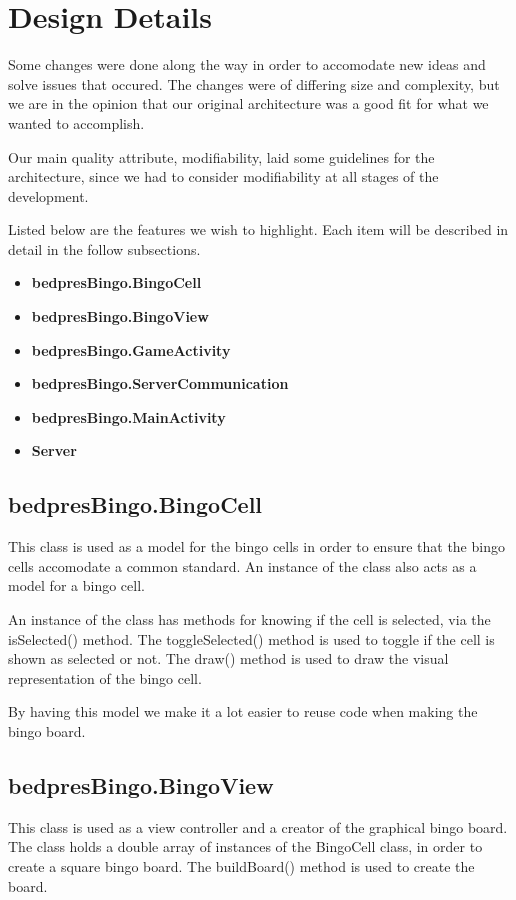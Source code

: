 \section{Design Details}
\label{designdetails}

Some changes were done along the way in order to accomodate new ideas and solve issues that occured. The changes were of differing size and complexity, but we are in the opinion that our original architecture was a good fit for what we wanted to accomplish. 

Our main quality attribute, modifiability, laid some guidelines for the architecture, since we had to consider modifiability at all stages of the development. 

Listed below are the features we wish to highlight.
Each item will be described in detail in the follow subsections.

\begin{itemize}
	\item \textbf{bedpresBingo.BingoCell} 
	\item \textbf{bedpresBingo.BingoView} 
	\item \textbf{bedpresBingo.GameActivity}
	\item \textbf{bedpresBingo.ServerCommunication} 
	\item \textbf{bedpresBingo.MainActivity} 
	\item \textbf{Server} 
\end{itemize}


\subsection{bedpresBingo.BingoCell}
This class is used as a model for the bingo cells in order to ensure that the bingo cells accomodate a common standard. An instance of the class also acts as a model for a bingo cell. 

An instance of the class has methods for knowing if the cell is selected, via the isSelected() method. The toggleSelected() method is used to toggle if the cell is shown as selected or not. The draw() method is used to draw the visual representation of the bingo cell. 

By having this model we make it a lot easier to reuse code when making the bingo board.

\subsection{bedpresBingo.BingoView}
This class is used as a view controller and a creator of the graphical bingo board. The class holds a double array of instances of the BingoCell class, in order to create a square bingo board. The buildBoard() method is used to create the board. 

